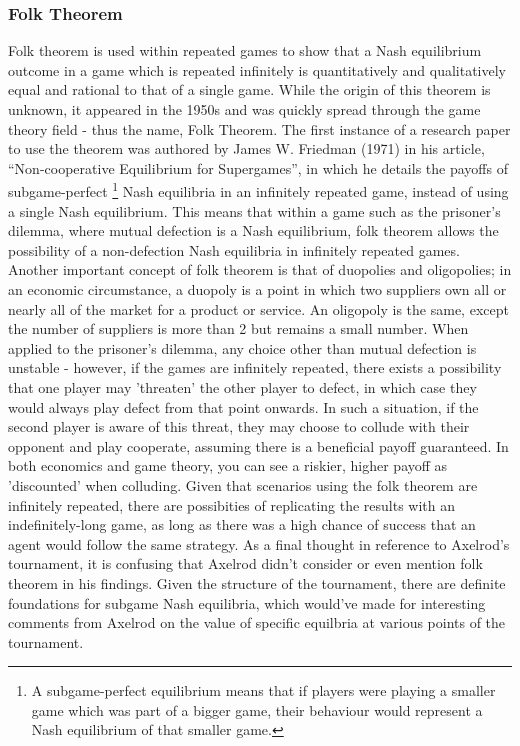 \documentclass[12pt,a4paper]{article}
\begin{document}
\subsubsection{Folk Theorem}
Folk theorem is used within repeated games to show that a Nash equilibrium outcome in a game which is repeated infinitely is quantitatively and qualitatively equal and rational to that of a single game. While the origin of this theorem is unknown, it appeared in the 1950s and was quickly spread through the game theory field - thus the name, Folk Theorem. The first instance of a research paper to use the theorem was authored by James W. Friedman (1971) in his article, “Non-cooperative Equilibrium for Supergames”\cite{11}, in which he details the payoffs of subgame-perfect \footnote{A subgame-perfect equilibrium means that if players were playing a smaller game which was part of a bigger game, their behaviour would represent a Nash equilibrium of that smaller game.} Nash equilibria in an infinitely repeated game, instead of using a single Nash equilibrium. This means that within a game such as the prisoner's dilemma, where mutual defection is a Nash equilibrium, folk theorem allows the possibility of a non-defection Nash equilibria in infinitely repeated games. Another important concept of folk theorem is that of duopolies and oligopolies; in an economic circumstance, a duopoly is a point in which two suppliers own all or nearly all of the market for a product or service. An oligopoly is the same, except the number of suppliers is more than 2 but remains a small number. When applied to the prisoner's dilemma, any choice other than mutual defection is unstable - however, if the games are infinitely repeated, there exists a possibility that one player may 'threaten' the other player to defect, in which case they would always play defect from that point onwards. In such a situation, if the second player is aware of this threat, they may choose to collude with their opponent and play cooperate, assuming there is a beneficial payoff guaranteed. In both economics and game theory, you can see a riskier, higher payoff as 'discounted' when colluding. Given that scenarios using the folk theorem are infinitely repeated, there are possibities of replicating the results with an indefinitely-long game, as long as there was a high chance of success that an agent would follow the same strategy. As a final thought in reference to Axelrod's tournament, it is confusing that Axelrod didn't consider or even mention folk theorem in his findings. Given the structure of the tournament, there are definite foundations for subgame Nash equilibria, which would've made for interesting comments from Axelrod on the value of specific equilbria at various points of the tournament. \\
\end{document}
